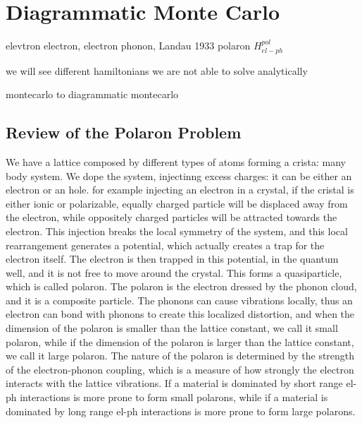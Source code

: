 \chapter{Diagrammatic Monte Carlo}

elevtron electron, electron phonon, Landau 1933 polaron \(H^{pol}_{el-ph}\)

we will see different hamiltonians we are not able to solve analytically

montecarlo to diagrammatic montecarlo

\section{Review of the Polaron Problem}

We have a lattice composed by different types of atoms forming a crista: many body system.
We dope the system, injectinng excess charges: it can be either an electron or an hole. for example injecting an electron in a crystal, if the cristal is either ionic or polarizable, equally charged particle will be displaced away from the electron, while oppositely charged particles will be attracted towards the electron. This injection breaks the local symmetry of the system, and this local rearrangement generates a potential, which actually creates a trap for the electron itself. The electron is then trapped in this potential, in the quantum well, and it is not free to move around the crystal. This forms a quasiparticle, which is called polaron. The polaron is the electron dressed by the phonon cloud, and it is a composite particle. The phonons can cause vibrations locally, thus an electron can bond with phonons to create this localized distortion, and when the dimension of the polaron is smaller than the lattice constant, we call it small polaron, while if the dimension of the polaron is larger than the lattice constant, we call it large polaron. The nature of the polaron is determined by the strength of the electron-phonon coupling, which is a measure of how strongly the electron interacts with the lattice vibrations. If a material is dominated by short range el-ph interactions is more prone to form small polarons, while if a material is dominated by long range el-ph interactions is more prone to form large polarons.

